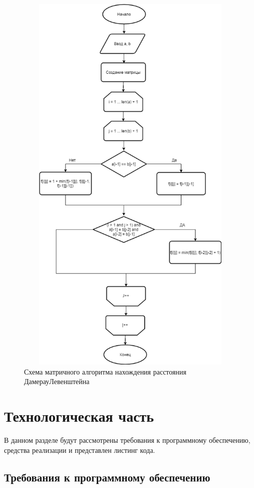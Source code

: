 \documentclass[a4paper,12pt]{article}
\begin{document}
\begin{figure}[H]
	\centering
	\includegraphics[width=12cm, height= 19cm]{damlevtable.png}
	\captionsetup{justification=centering}
	\caption{Схема матричного алгоритма нахождения расстояния ДамерауЛевенштейна}
	\label{Рис 4}
\end{figure}

\newpage
\section{Технологическая часть}

\hfill

В данном разделе будут рассмотрены требования к программному обеспечению, средства реализации и представлен листинг кода. 

\subsection{Требования к программному обеспечению}
\end{document}
